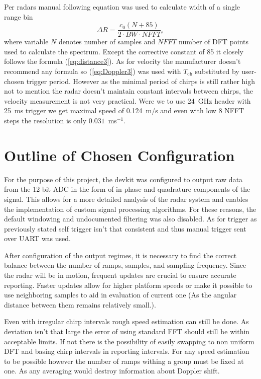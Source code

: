 Per radars manual \cite{sidarPRO} following equation was used to calculate width of a single range bin
\begin{equation}
  \Delta R = \frac{c_0 (N+85)}{2\cdot BW\cdot NFFT},
  \label{eq:rangeBin}
\end{equation}
where variable $N$ denotes number of samples and $NFFT$ number of DFT points used to calculate the spectrum.
Except the corrective constant of 85 it closely follows the formula (\ref{eq:distance3}).
As for velocity the manufacturer doesn't recommend any formula so (\ref{eq:Doppler3}) was used with $T_\mathrm{ch}$ substituted by user-chosen trigger period.
However as the minimal period of chirps is still rather high not to mention the radar doesn't maintain constant intervals between chirps, the velocity measurement is not very practical.
Were we to use 24~GHz header with 25~ms trigger we get maximal speed of 0.124~m/s and even with low 8 NFFT steps the resolution is only $0.031$~ms$^{-1}$.

\section{Outline of Chosen Configuration }


For the purpose of this project, the devkit was configured to output raw data from the 12-bit ADC in the form of in-phase and quadrature components of the signal.
This allows for a more detailed analysis of the radar system and enables the implementation of custom signal processing algorithms.
For these reasons, the default windowing and undocumented filtering was also disabled.
As for trigger as previously stated self trigger isn't that consistent and thus manual trigger sent over UART was used.

After configuration of the output regimes, it is necessary to find the correct balance between the number of ramps, samples, and sampling frequency.
Since the radar will be in motion, frequent updates are crucial to ensure accurate reporting.
Faster updates allow for higher platform speeds or make it possible to use neighboring samples to aid in evaluation of current one (As the angular distance between them remains relatively small.).

Even with irregular chirp intervals rough speed estimation can still be done.
As deviation isn't that large the error of using standard FFT should still be within acceptable limits.
If not there is the possibility of easily swapping to non uniform DFT and basing chirp intervals in reporting intervals.
For any speed estimation to be possible however the number of ramps withing a group must be fixed at one.
As any averaging would destroy information about Doppler shift.

